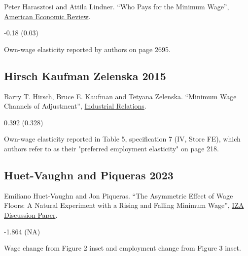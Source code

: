 \noindent Peter Harasztosi and Attila Lindner. ``Who Pays for the Minimum Wage'', \href{https://doi.org/10.1257/aer.20171445}{American Economic Review}.

\vspace{0.7em}

 -0.18 (0.03)

\vspace{0.7em}

 Own-wage elasticity reported by authors on page 2695.

\subsection*{Hirsch Kaufman Zelenska 2015}
\vspace{-0.7em}

\noindent Barry T. Hirsch, Bruce E. Kaufman and Tetyana Zelenska. ``Minimum Wage Channels of Adjustment'', \href{https://doi.org/10.1111/irel.12091}{Industrial Relations}.

\vspace{0.7em}

 0.392 (0.328)

\vspace{0.7em}

 Own-wage elasticity reported in Table 5, specification 7 (IV, Store FE), which authors refer to as their "preferred employment elasticity" on page 218.

\subsection*{Huet-Vaughn and Piqueras 2023}
\vspace{-0.7em}

\noindent Emiliano Huet-Vaughn and Jon Piqueras. ``The Asymmetric Effect of Wage Floors: A Natural Experiment with a Rising and Falling Minimum Wage'', \href{https://docs.iza.org/dp16684.pdf}{IZA Discussion Paper}.

\vspace{0.7em}

 -1.864 (NA)

\vspace{0.7em}

 Wage change from Figure 2 inset and employment change from Figure 3 inset.

